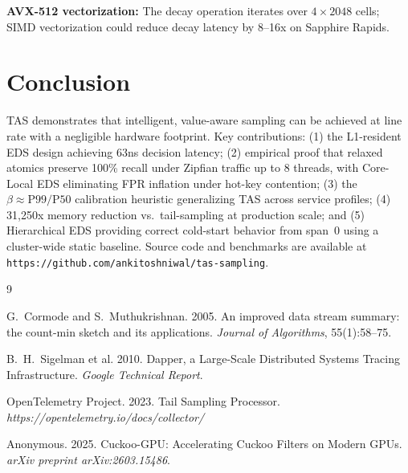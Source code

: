 \documentclass[sigconf,nonacm]{acmart}
\begin{document}
\textbf{AVX-512 vectorization:} The decay operation iterates over $4 \times 2048$ cells;
SIMD vectorization could reduce decay latency by 8--16x on Sapphire Rapids.

\section{Conclusion}

TAS demonstrates that intelligent, value-aware sampling can be achieved at line rate
with a negligible hardware footprint. Key contributions: (1) the L1-resident EDS design
achieving 63ns decision latency; (2) empirical proof that relaxed atomics preserve 100\%
recall under Zipfian traffic up to 8 threads, with Core-Local EDS eliminating FPR
inflation under hot-key contention; (3) the $\beta \approx \text{P99/P50}$ calibration
heuristic generalizing TAS across service profiles; (4) 31,250x memory reduction vs.\
tail-sampling at production scale; and (5) Hierarchical EDS providing correct cold-start
behavior from span~0 using a cluster-wide static baseline. Source code and benchmarks
are available at \texttt{https://github.com/ankitoshniwal/tas-sampling}.


\begin{thebibliography}{9}

G.~Cormode and S.~Muthukrishnan.
2005.
An improved data stream summary: the count-min sketch and its applications.
\textit{Journal of Algorithms}, 55(1):58--75.

B.~H.~Sigelman et al.
2010.
Dapper, a Large-Scale Distributed Systems Tracing Infrastructure.
\textit{Google Technical Report}.

OpenTelemetry Project.
2023.
Tail Sampling Processor.
\textit{https://opentelemetry.io/docs/collector/}

Anonymous.
2025.
Cuckoo-GPU: Accelerating Cuckoo Filters on Modern GPUs.
\textit{arXiv preprint arXiv:2603.15486}.

\end{thebibliography}
\end{document}
